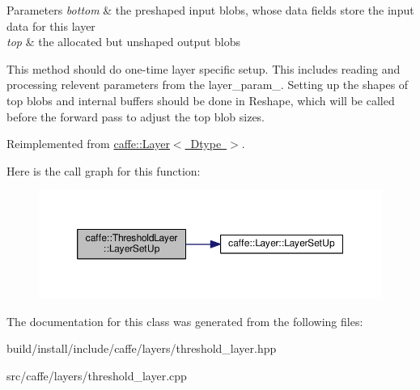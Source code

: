 \begin{DoxyParams}{Parameters}
{\em bottom} & the preshaped input blobs, whose data fields store the input data for this layer \\
\hline
{\em top} & the allocated but unshaped output blobs\\
\hline
\end{DoxyParams}
This method should do one-\/time layer specific setup. This includes reading and processing relevent parameters from the {\ttfamily layer\+\_\+param\+\_\+}. Setting up the shapes of top blobs and internal buffers should be done in {\ttfamily Reshape}, which will be called before the forward pass to adjust the top blob sizes. 

Reimplemented from \mbox{\hyperlink{classcaffe_1_1_layer_a481323a3e0972c682787f2137468c29f}{caffe\+::\+Layer$<$ Dtype $>$}}.

Here is the call graph for this function\+:
\nopagebreak
\begin{figure}[H]
\begin{center}
\leavevmode
\includegraphics[width=350pt]{classcaffe_1_1_threshold_layer_a14e3782a6bea7bba511f3d6f23344037_cgraph}
\end{center}
\end{figure}


The documentation for this class was generated from the following files\+:\begin{DoxyCompactItemize}
\item 
build/install/include/caffe/layers/threshold\+\_\+layer.\+hpp\item 
src/caffe/layers/threshold\+\_\+layer.\+cpp\end{DoxyCompactItemize}

